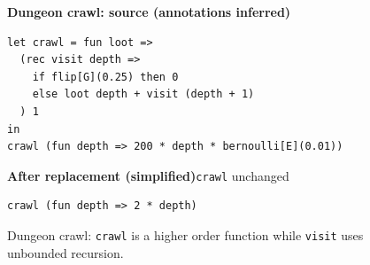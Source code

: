 \begin{figure}[htbp]
\centering
\begin{minipage}{\linewidth}
\raggedright
\lstset{xleftmargin=0pt}
\textbf{Dungeon crawl: source (annotations inferred)}
\begin{lstlisting}
let crawl = fun loot =>
  (rec visit depth =>
    if flip[G](0.25) then 0
    else loot depth + visit (depth + 1)
  ) 1
in
crawl (fun depth => 200 * depth * bernoulli[E](0.01))
\end{lstlisting}
\medskip
\textbf{After replacement (simplified)}\quad\texttt{crawl} unchanged
\begin{lstlisting}
crawl (fun depth => 2 * depth)
\end{lstlisting}
\end{minipage}
\caption{Dungeon crawl: \texttt{crawl} is a higher order function while \texttt{visit} uses unbounded recursion.}
\label{fig:intro-dungeon}
\end{figure}

